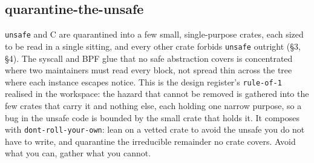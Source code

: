 \hypertarget{quarantine-the-unsafe}{%
\subsection{quarantine-the-unsafe}\label{quarantine-the-unsafe}}

\texttt{unsafe} and C are quarantined into a few small, single-purpose
crates, each sized to be read in a single sitting, and every other crate
forbids \texttt{unsafe} outright (§3, §4). The syscall and BPF glue that
no safe abstraction covers is concentrated where two maintainers must
read every block, not spread thin across the tree where each instance
escapes notice. This is the design register's \texttt{rule-of-1}
realised in the workspace: the hazard that cannot be removed is gathered
into the few crates that carry it and nothing else, each holding one
narrow purpose, so a bug in the unsafe code is bounded by the small
crate that holds it. It composes with \texttt{dont-roll-your-own}: lean
on a vetted crate to avoid the unsafe you do not have to write, and
quarantine the irreducible remainder no crate covers. Avoid what you
can, gather what you cannot.
